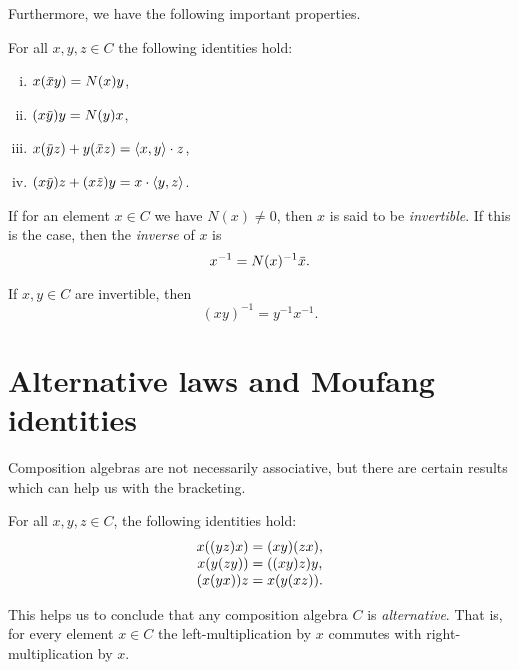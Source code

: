 Furthermore, we have the following important properties. 

\begin{lemma}
	For all $x,y,z \in C$ the following identities hold: 
	\begin{enumerate}[(i)]
		\item $x(\mathord{\mbox{\hspace*{0pt}}\,\overline{\!x\!\!\;}\!\:}\mbox{\hspace*{0pt}} y) = N(x) y$,
		\item $(x\mathord{\mbox{\hspace*{0pt}}\,\overline{\!y\!\!\;}\!\:}\mbox{\hspace*{0pt}}) y = N(y) x$,
		\item $x (\ovy z) + y (\ovx z) = \inner{x}{y} \cdot z$,
		\item $(x \ovy) z + (x \ovz) y = x\cdot \inner{y}{z}$. 
	\end{enumerate}	 
\end{lemma}

If for an element $x \in C$ we have $N(x)\neq 0$, then $x$ is said to be \textit{invertible}.
If this is the case, then the \textit{inverse} of $x$ is
\begin{equation}
	\label{eq:inverse}
	x^{-1} = N(x)^{-1} \mathord{\mbox{\hspace*{0pt}}\,\overline{\!x\!\!\;}\!\:}\mbox{\hspace*{0pt}}. 
\end{equation}

\begin{lemma}
	If $x,y \in C$ are invertible, then
	\begin{equation}
		(x y)^{-1} = y^{-1} x^{-1}.
	\end{equation}
\end{lemma}

\section{Alternative laws and Moufang identities}

Composition algebras are not necessarily associative, but there are certain results which 
can help us with the bracketing.

\begin{lemma}
	For all $x,y,z\in C$, the following identities hold:
	\begin{equation}
		\begin{array}{r@{\;}c@{\;}l}
			x((yz)x) & = & (xy)(zx), \\
			x(y(zy)) & = & ((xy)z)y, \\
			(x(yx))z & = & x(y(xz)).
		\end{array}
	\end{equation}
\end{lemma}

This helps us to conclude that any composition algebra $C$ is \textit{alternative}.
That is, for every element $x \in C$ the left-multiplication by $x$ commutes with 
right-multiplication by $x$. 

